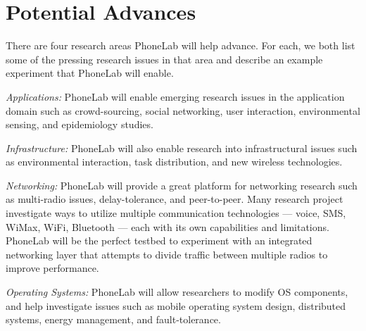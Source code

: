 \section{Potential Advances} There are four research areas
PhoneLab will help advance. For each, we both list some of the pressing
research issues in that area and describe an example experiment that
PhoneLab will enable.

\emph{Applications:} PhoneLab will enable emerging research issues in the
application domain such as crowd-sourcing, social networking, user interaction,
environmental sensing, and epidemiology studies. 



\emph{Infrastructure:} PhoneLab will also enable research into infrastructural
issues such as environmental interaction, task distribution, and new wireless
technologies. 


\emph{Networking:} PhoneLab will provide a great platform for networking
research such as multi-radio issues, delay-tolerance, and peer-to-peer.
Many research project investigate ways to utilize multiple communication
technologies --- voice, SMS, WiMax, WiFi, Bluetooth --- each with its own
capabilities and limitations. PhoneLab will be the perfect testbed to experiment
with an integrated networking layer that attempts to divide traffic between
multiple radios to improve performance.

\emph{Operating Systems:} PhoneLab will allow researchers to modify OS
components, and help investigate issues such as mobile operating system
design, distributed systems, energy management, and fault-tolerance.


